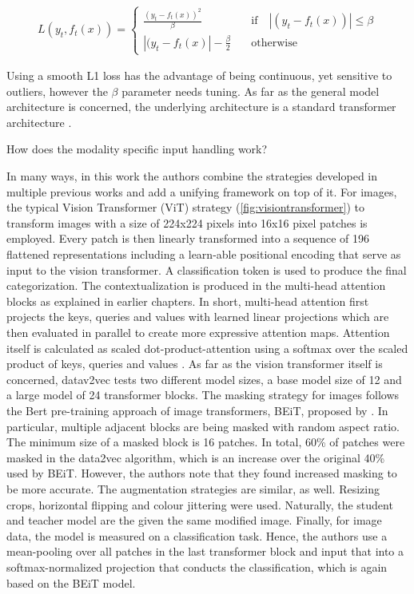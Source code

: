 \documentclass[
]{krantz}
\begin{document}
\begin{align*}
       L(y_t,f_t(x)) =
    \begin{cases}
        \frac{(y_t - f_t(x))^2}{\beta}    \quad &\text{if} \quad | (y_t - f_t(x)) | \leq \beta \\
        | (y_t - f_t(x) | - \frac{\beta}{2} \quad &\text{otherwise}
    \end{cases}
\end{align*}

Using a smooth L1 loss has the advantage of being continuous, yet sensitive to outliers, however the \(\beta\) parameter needs tuning. As far as the general model architecture is concerned, the underlying architecture is a standard transformer architecture \citep{vaswani2017attention}.

How does the modality specific input handling work?

In many ways, in this work the authors combine the strategies developed in multiple previous works and add a unifying framework on top of it. For images, the typical Vision Transformer (ViT) strategy (\ref{fig:visiontransformer}) to transform images with a size of 224x224 pixels into 16x16 pixel patches is employed. Every patch is then linearly transformed into a sequence of 196 flattened representations including a learn-able positional encoding that serve as input to the vision transformer. A classification token is used to produce the final categorization. The contextualization is produced in the multi-head attention blocks as explained in earlier chapters. In short, multi-head attention first projects the keys, queries and values with learned linear projections which are then evaluated in parallel to create more expressive attention maps. Attention itself is calculated as scaled dot-product-attention using a softmax over the scaled product of keys, queries and values \citep{vaswani2017attention}. As far as the vision transformer itself is concerned, datav2vec tests two different model sizes, a base model size of 12 and a large model of 24 transformer blocks. The masking strategy for images follows the Bert pre-training approach of image transformers, BEiT, proposed by \citet{bao2021beit}. In particular, multiple adjacent blocks are being masked with random aspect ratio. The minimum size of a masked block is 16 patches. In total, 60\% of patches were masked in the data2vec algorithm, which is an increase over the original 40\% used by BEiT. However, the authors note that they found increased masking to be more accurate. The augmentation strategies are similar, as well. Resizing crops, horizontal flipping and colour jittering were used. Naturally, the student and teacher model are the given the same modified image. Finally, for image data, the model is measured on a classification task. Hence, the authors use a mean-pooling over all patches in the last transformer block and input that into a softmax-normalized projection that conducts the classification, which is again based on the BEiT model.
\end{document}
